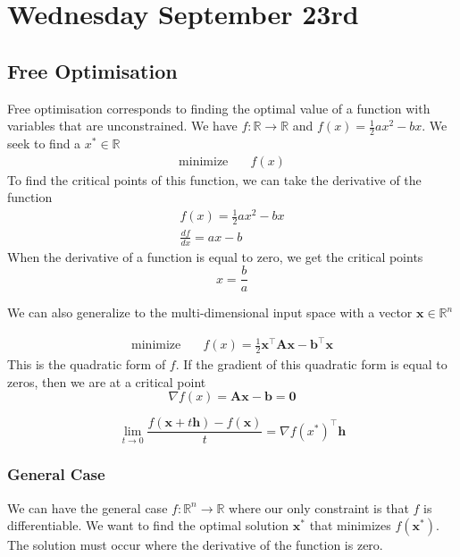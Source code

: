 \documentclass[11pt]{article}
\begin{document}
\section{Wednesday September 23rd}
\subsection{Free Optimisation}
Free optimisation corresponds to finding the optimal value of a function with variables that are unconstrained.
We have $f : \mathbb{R} \to \mathbb{R}$ and $f(x) = \frac{1}{2} a x^2 - bx$.
We seek to find a $x^* \in \mathbb{R}$
\begin{align}
  \text{minimize} & \quad f(x) 
\end{align}
To find the critical points of this function, we can take the derivative of the function
\begin{gather}
    f(x) = \frac{1}{2} a x^2 - bx \\
    \frac{d f}{d x } =  ax - b 
\end{gather}
When the derivative of a function is equal to zero, we get the critical points
\begin{equation}
    x = \frac{b}{a}
\end{equation}

We can also generalize to the multi-dimensional input space with a vector $\mathbf{x} \in \mathbb{R}^{n}$

\begin{align}
  \text{minimize} & \quad f(x) = \frac{1}{2}  \textbf{x}^\top \textbf{A} \textbf{x} - \textbf{b}^\top \textbf{x}
\end{align}
This is the quadratic form of $f$.
If the gradient of this quadratic form is equal to zeros, then we are at a critical point
\begin{equation}
    \nabla f(x) = \textbf{A} \textbf{x} - \textbf{b} = \textbf{0}
\end{equation}

\begin{equation}
    \lim_{t \to 0} \frac{f(\textbf{x} + t \textbf{h}) - f(\textbf{x})}{t} = \nabla f(x^*)^\top \textbf{h}
\end{equation}

\subsubsection{General Case}
We can have the general case $f : \mathbb{R}^n \to \mathbb{R}$ where our only constraint is that $f$ is differentiable.
We want to find the optimal solution $\textbf{x}^*$ that minimizes $f(\textbf{x}^*)$.
The solution must occur where the derivative of the function is zero.
\end{document}
